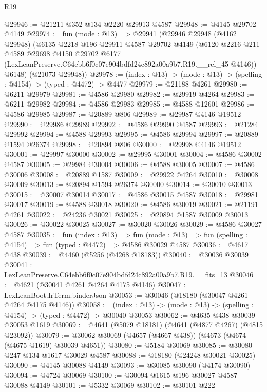 \begin{lexlean}{R19}
\begin{coremodule}
@29946 := @21211 @352 @134 @2220 @29913 @4587
@29948 := @4145 @29702 @4149
@29974 := fun (mode : @13) =>
  @29941
    (@29946
      @29948
      (@4162 @29948)
      (@6135
        @2218
        @196
        @29911
        @4587
        @29702
        @4149
        (@6120
          @2216
          @211
          @4589
          @29698
          @4150
          @29702
          @6177
          (LexLeanPreserve.C64ebb6f0c07e904bdfd24c892a00a9b7.R19.__rel_45 @4146))
        @6148)
      (@21073 @29948))
@29978 := (index : @13) -> (mode : @13) -> (spelling : @4154) -> (typed : @4472) -> @4477
@29979 := @21188 @4261
@29980 := @6211 @29979
@29981 := @4586 @29980
@29982 := @29919 @4264
@29983 := @6211 @29982
@29984 := @4586 @29983
@29985 := @4588 @12601
@29986 := @4586 @29985
@29987 := @20889 @806
@29989 := @29987 @4146 @19512
@29990 := @29986 @29989
@29992 := @4586 @29990 @4587
@29993 := @21284 @29992
@29994 := @4588 @29993
@29995 := @4586 @29994
@29997 := @20889 @1594 @26374
@29998 := @20894 @806
@30000 := @29998 @4146 @19512
@30001 := @29997 @30000
@30002 := @29995 @30001
@30004 := @4586 @30002 @4587
@30005 := @29984 @30004
@30006 := @4588 @30005
@30007 := @4586 @30006
@30008 := @20889 @1587
@30009 := @29922 @4264
@30010 := @30008 @30009
@30013 := @20894 @1594 @26374 @30000
@30014 := @30010 @30013
@30015 := @30007 @30014
@30017 := @4586 @30015 @4587
@30018 := @29981 @30017
@30019 := @4588 @30018
@30020 := @4586 @30019
@30021 := @21191 @4261
@30022 := @24236 @30021
@30025 := @20894 @1587 @30009 @30013
@30026 := @30022 @30025
@30027 := @30020 @30026
@30029 := @4586 @30027 @4587
@30035 := fun (index : @13) =>
  fun (mode : @13) => fun (spelling : @4154) => fun (typed : @4472) => @4586 @30029 @4587
@30036 := @4617 @438
@30039 := @4460 (@5256 (@4268 @18183))
@30040 := @30036 @30039
@30041 := LexLeanPreserve.C64ebb6f0c07e904bdfd24c892a00a9b7.R19.__fits_13
@30046 := @4621 (@30041 @4261 @4264 @4175 @4146)
@30047 := LexLeanBoot.IrTerm.binderJson
@30053 := @30046 (@18180 (@30047 @4261 @4264 @4175 @4146))
@30058 := (index : @13) -> (mode : @13) -> (spelling : @4154) -> (typed : @4472) -> @30040 @30053
@30062 := @4635 @438 @30039 @30053 @1619
@30069 := @4641 (@5079 @18181) (@4641 (@4877 @4267) (@4815 @23092))
@30079 := @30062 @30069 (@4657 (@4667 @438)) (@4673 (@4674 (@4675 @1619) @30039 @4651))
@30080 := @5184 @30069
@30085 := @30080 @247 @134 @1617 @30029 @4587
@30088 := @18180 (@24248 @30021 @30025)
@30090 := @4145 @30088 @4149
@30093 := @30085 @30090 (@4174 @30090)
@30094 := @4724 @30069
@30100 := @30094 @1615 @196 @30027 @4587 @30088 @4149
@30101 := @5332 @30069
@30102 := @30101 @222

\end{coremodule}
\end{lexlean}
